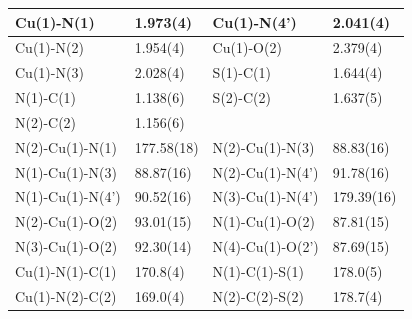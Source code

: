 \begin{table}
\centering
{}
\begin{tabular}{|l|l|l|l|}
\hline
Cu(1)-N(1) & 1.973(4) & Cu(1)-N(4') & 2.041(4)\\
\hline
Cu(1)-N(2) & 1.954(4) & Cu(1)-O(2) & 2.379(4)\\
\hline
Cu(1)-N(3) & 2.028(4) & S(1)-C(1) & 1.644(4)\\
\hline
N(1)-C(1) & 1.138(6) & S(2)-C(2) & 1.637(5)\\
\hline
N(2)-C(2) & 1.156(6) &  & \\
\hline
\hline
N(2)-Cu(1)-N(1) & 177.58(18) & N(2)-Cu(1)-N(3) & 88.83(16)\\
\hline
N(1)-Cu(1)-N(3) & 88.87(16) & N(2)-Cu(1)-N(4') & 91.78(16)\\
\hline
N(1)-Cu(1)-N(4') & 90.52(16) & N(3)-Cu(1)-N(4') & 179.39(16)\\
\hline
N(2)-Cu(1)-O(2) & 93.01(15) & N(1)-Cu(1)-O(2) & 87.81(15)\\
\hline
N(3)-Cu(1)-O(2) & 92.30(14) &N(4)-Cu(1)-O(2') & 87.69(15)\\
\hline
Cu(1)-N(1)-C(1) & 170.8(4) & N(1)-C(1)-S(1) & 178.0(5)\\
\hline
Cu(1)-N(2)-C(2) & 169.0(4) & N(2)-C(2)-S(2) & 178.7(4)\\
\hline
\end{tabular}
\label{batlb:CuR4HOMP}
\end{table}






